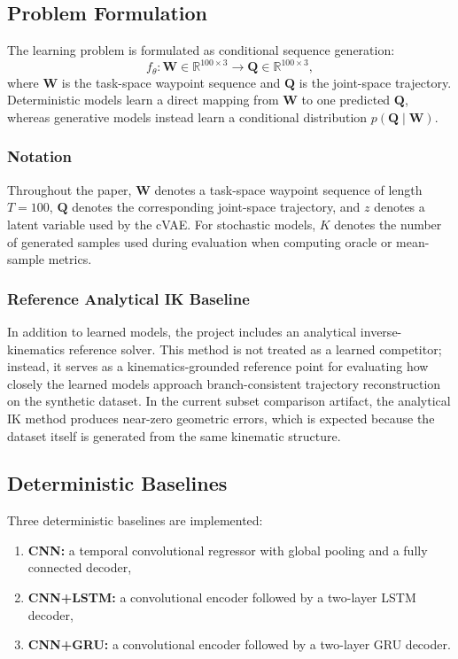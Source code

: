 \documentclass[11pt]{article}
\begin{document}
\subsection{Problem Formulation}

The learning problem is formulated as conditional sequence generation:
\begin{equation}
    f_\theta : \mathbf{W} \in \mathbb{R}^{100 \times 3} \rightarrow \mathbf{Q} \in \mathbb{R}^{100 \times 3},
\end{equation}
where $\mathbf{W}$ is the task-space waypoint sequence and $\mathbf{Q}$ is the joint-space trajectory. Deterministic models learn a direct mapping from $\mathbf{W}$ to one predicted $\mathbf{Q}$, whereas generative models instead learn a conditional distribution $p(\mathbf{Q}\mid\mathbf{W})$.

\subsubsection{Notation}

Throughout the paper, $\mathbf{W}$ denotes a task-space waypoint sequence of length $T=100$, $\mathbf{Q}$ denotes the corresponding joint-space trajectory, and $z$ denotes a latent variable used by the cVAE. For stochastic models, $K$ denotes the number of generated samples used during evaluation when computing oracle or mean-sample metrics.

\subsubsection{Reference Analytical IK Baseline}

In addition to learned models, the project includes an analytical inverse-kinematics reference solver. This method is not treated as a learned competitor; instead, it serves as a kinematics-grounded reference point for evaluating how closely the learned models approach branch-consistent trajectory reconstruction on the synthetic dataset. In the current subset comparison artifact, the analytical IK method produces near-zero geometric errors, which is expected because the dataset itself is generated from the same kinematic structure.

\subsection{Deterministic Baselines}

Three deterministic baselines are implemented:
\begin{enumerate}[leftmargin=1.5em]
    \item \textbf{CNN:} a temporal convolutional regressor with global pooling and a fully connected decoder,
    \item \textbf{CNN+LSTM:} a convolutional encoder followed by a two-layer LSTM decoder,
    \item \textbf{CNN+GRU:} a convolutional encoder followed by a two-layer GRU decoder.
\end{enumerate}
\end{document}
